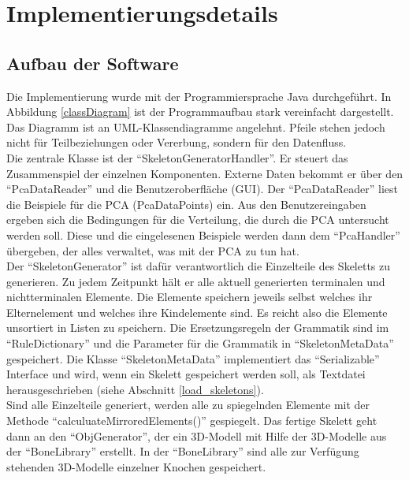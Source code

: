 \chapter{Implementierungsdetails}
\label{chapter:implementation_detail}


\section{Aufbau der Software}
\label{software_architecture}

Die Implementierung wurde mit der Programmiersprache Java durchgeführt. In Abbildung \ref{classDiagram} ist der Programmaufbau stark vereinfacht dargestellt. Das Diagramm ist an UML-Klassendiagramme angelehnt. Pfeile stehen jedoch nicht für Teilbeziehungen oder Vererbung, sondern für den Datenfluss.\\
Die zentrale Klasse ist der "`SkeletonGeneratorHandler"'. Er steuert das Zusammenspiel der einzelnen Komponenten.
Externe Daten bekommt er über den "`PcaDataReader"' und die Benutzeroberfläche (GUI). Der "`PcaDataReader"' liest die Beispiele für die PCA (PcaDataPoints) ein. Aus den Benutzereingaben ergeben sich die Bedingungen für die Verteilung, die durch die PCA untersucht werden soll. Diese und die eingelesenen Beispiele werden dann dem "`PcaHandler"' übergeben, der alles verwaltet, was mit der PCA zu tun hat.\\
Der "`SkeletonGenerator"' ist dafür verantwortlich die Einzelteile des Skeletts zu generieren. Zu jedem Zeitpunkt hält er alle aktuell generierten terminalen und nichtterminalen Elemente. Die Elemente speichern jeweils selbst welches ihr Elternelement und welches ihre Kindelemente sind. Es reicht also die Elemente unsortiert in Listen zu speichern. Die Ersetzungsregeln der Grammatik sind im "`RuleDictionary"' und die Parameter für die Grammatik in "`SkeletonMetaData"' gespeichert. Die Klasse "`SkeletonMetaData"' implementiert das "`Serializable"' Interface \cite{JavaSerialization} und wird, wenn ein Skelett gespeichert werden soll, als Textdatei herausgeschrieben (siehe Abschnitt \ref{load_skeletons}).\\
Sind alle Einzelteile generiert, werden alle zu spiegelnden Elemente mit der Methode \mbox{"`calculuateMirroredElements()"'} gespiegelt. Das fertige Skelett geht dann an den "`ObjGenerator"', der ein 3D-Modell mit Hilfe der 3D-Modelle aus der "`BoneLibrary"' erstellt. In der "`BoneLibrary"' sind alle zur Verfügung stehenden 3D-Modelle einzelner Knochen gespeichert.


